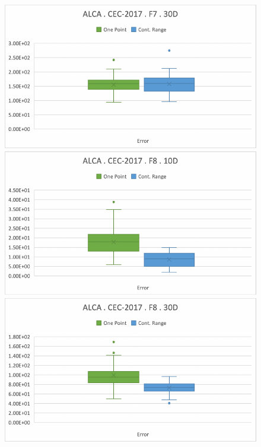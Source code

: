 \documentclass[graybox]{svmult}
\begin{document}
\begin{figure}[!ht]
\begin{minipage}[h]{0.49\linewidth}
        \end{minipage}
        \hfill
        \begin{minipage}[h]{0.49\linewidth}
            \includegraphics[width=1\linewidth]{img/fig_experiment_F7x30D.pdf} 
        \end{minipage}
        \vfill
        \vspace{0.05 cm}
        \begin{minipage}[h]{0.49\linewidth}
            \includegraphics[width=1\linewidth]{img/fig_experiment_F8x10D.pdf} 
        \end{minipage}
        \hfill
        \begin{minipage}[h]{0.49\linewidth}
            \includegraphics[width=1\linewidth]{img/fig_experiment_F8x30D.pdf} 
        \end{minipage}


\end{figure}
\end{document}
